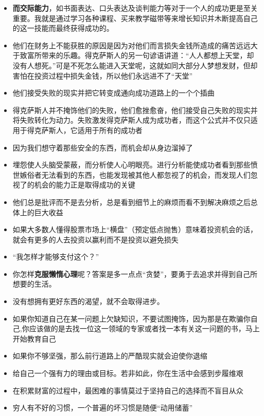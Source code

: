 \documentclass[UTF8,a4paper,8pt]{ctexbook}
\begin{document}
\begin{itemize}
			\item \textbf{而交际能力}，如书面表达、口头表达及谈判能力等对于一个人的成功更是至关重要。我就是通过学习各种课程、买来教学磁带等来增长知识并木断提高自己的这一技能而最终获得成功的。
			\item 他们在财务上不能获胜的原因是因为对他们而言损失金钱所造成的痛苦远远大于致富所带来的乐趣。得克萨斯人的另一句谚语讲道：“人人都想上天堂，却没有人想死。”可是不死怎么能进入天堂呢，这就如同大部分人梦想发财，但却害怕在投资过程中损失金钱，所以他们永远进不了“天堂”
			\item 他们接受失败的现实并把它转变成通向成功道路上的一个个插曲
			\item 得克萨斯人并不掩饰他们的失败，他们愈挫愈奋，他们接受自己失败的现实并将失败转化为动力。失败激发得克萨斯人成为成功者，而这个公式并不仅只适用于得克萨斯人，它适用于所有的成功者
			\item 因为我们想守着那些安全的东西，而机会却从身边溜掉了
			\item 埋怨使人头脑受蒙蔽，而分析使人心明眼亮。进行分析能使成功者看到那些愤世嫉俗者无法看到的东西，也能发现被其他人都忽视了的机会，而发现人们忽视了的机会的能力正是取得成功的关键
			\item 他们总是批评而不是去分析，总是看到细节上的麻烦而看不到解决麻烦之后总体上的巨大收益
			\item 如果大多数人懂得股票市场上“横盘”（预定低点抛售）意味着投资机会的话，就会有更多的人去投资以赢利而不是投资以避免损失
			\item “我怎样才能够支付这个？”
			\item 你怎样\textbf{克服懒惰心理}呢？答案是多一点点“贪婪”，要勇于去追求并得到自己所想要的生活。
			\item 没有想拥有更好东西的渴望，就不会取得进步。
			\item 如果你知道自己在某一问题上欠缺知识，不要试图掩饰，因为那是在欺骗你自己,你应该做的是去找一位这一领域的专家或者找一本有关这一问题的书，马上开始教育自己
			\item 如果你不够坚强，那么前行道路上的严酷现实就会迫使你退缩
			\item 给自己一个强有力的理由或目标。若非如此，你在生活中会感到步履维艰
			\item 在积累财富的过程中，最困难的事情莫过于坚持自己的选择而不盲目从众
			\item 穷人有不好的习惯，一个普遍的坏习惯是随便“动用储蓄”
			

\end{itemize}
\end{document}
